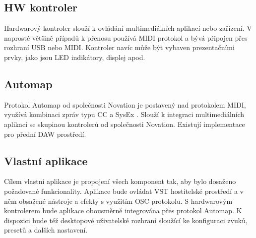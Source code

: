 \documentclass[thesis=M,czech]{FITthesis}[2019/03/06]
\begin{document}
		\subsection{HW kontroler}
			Hardwarový kontroler slouží k ovládání multimediálních aplikací nebo zařízení. V naprosté většině případů k přenosu používá MIDI protokol
			a bývá připojen přes rozhraní USB nebo MIDI. Kontroler navíc může být vybaven prezentačními prvky, jako jsou LED indikátory, displej apod.

		\subsection{Automap}
			Protokol Automap od společnosti Novation je postavený nad protokolem MIDI, využívá kombinaci zpráv typu CC a SysEx \cite{midi}\cite{automap}.
			Slouží k integraci multimediálních aplikací se skupinou kontrolerů od společnosti Novation. Existují implementace pro 
			přední DAW prostředí.

		\subsection{Vlastní aplikace}
			Cílem vlastní aplikace je propojení všech komponent tak, aby bylo dosaženo požadované funkcionality.
			Aplikace bude ovládat VST hostitelské prostředí a v něm obsažené nástroje a efekty s využitím OSC protokolu.
			S hardwarovým kontrolerem bude aplikace obousměrně integrována přes protokol Automap.
			K dispozici bude též desktopové uživatelské rozhraní sloužící ke konfiguraci zvuků, presetů a dalších nastavení.
\clearpage
\end{document}
